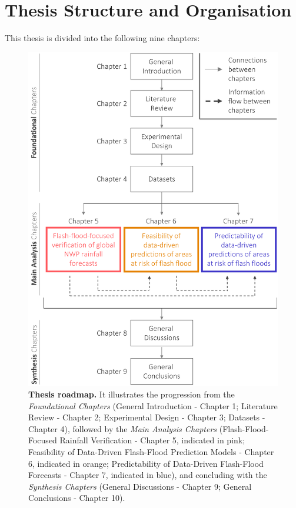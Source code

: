 \section{Thesis Structure and Organisation}
This thesis is divided into the following nine chapters:

\begin{figure}[htbp]
\centering
\includegraphics[width=\textwidth]{thesis_roadmap.png}
\caption{\textbf{Thesis roadmap.} It illustrates the progression from the \textit{Foundational Chapters} (General Introduction - Chapter 1; Literature Review - Chapter 2; Experimental Design - Chapter 3; Datasets - Chapter 4), followed by the \textit{Main Analysis Chapters} (Flash-Flood-Focused Rainfall Verification - Chapter 5, indicated in pink; Feasibility of Data-Driven Flash-Flood Prediction Models - Chapter 6, indicated in orange; Predictability of Data-Driven Flash-Flood Forecasts - Chapter 7, indicated in blue), and concluding with the \textit{Synthesis Chapters} (General Discussions - Chapter 9; General Conclusions - Chapter 10).}
\label{fig:thesis_structure}
\end{figure}

